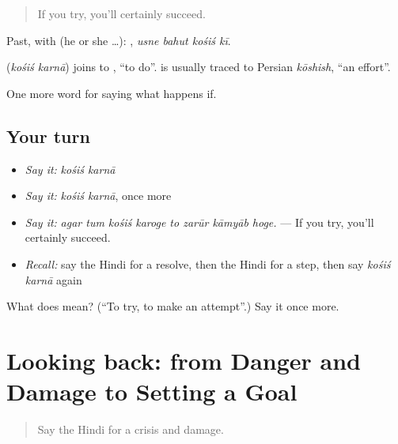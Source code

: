 \begin{quote}
If you try, you'll certainly succeed.
\end{quote}

Past, with  (he or she …):    , \emph{usne bahut kośiś kī}.

\begin{cousinweb}
\textbf{ } (\emph{kośiś karnā}) joins  to , \textquotedblleft{}to do\textquotedblright{}.  is usually traced to Persian \emph{kōshish}, \textquotedblleft{}an effort\textquotedblright{}.
\end{cousinweb}

\begin{grammarlens}[title={What you've built}]
One more word for saying what happens if.
\end{grammarlens}

\subsection*{Your turn}
\begin{itemize}
\raggedright
  \item \emph{Say it:} \emph{kośiś karnā}
  \item \emph{Say it:} \emph{kośiś karnā}, once more
  \item \emph{Say it:} \emph{agar tum kośiś karoge to zarūr kāmyāb hoge.} — If you try, you'll certainly succeed.
  \item \emph{Recall:} say the Hindi for a resolve, then the Hindi for a step, then say \emph{kośiś karnā} again
\end{itemize}

\begin{tcolorbox}[breakable,colback=teal!4,colframe=teal!35!black,title={Before you move on}]
What does   mean? (\textquotedblleft{}To try, to make an attempt\textquotedblright{}.) Say it once more.
\end{tcolorbox}
\section[(dialogue)]{Looking back: from Danger and Damage to Setting a Goal}

\label{lesson:HI-R390-review-383-390}



\begin{quote}
Say the Hindi for a crisis and damage.
\end{quote}


